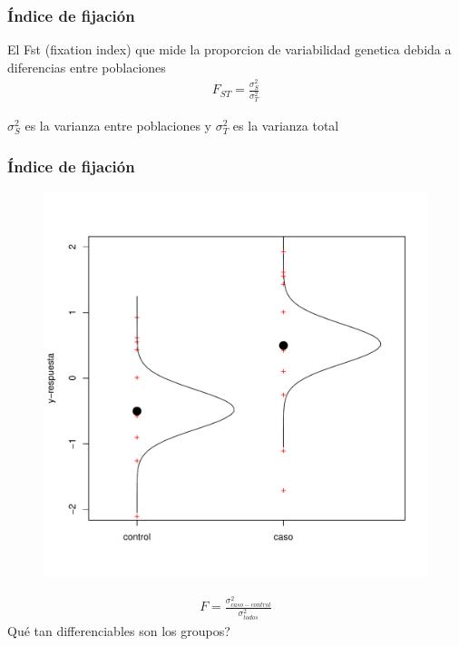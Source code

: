 \documentclass{beamer}\usepackage[]{graphicx}\usepackage[]{color}
\begin{document}
\begin{frame}[fragile]
\frametitle{\'Indice de fijaci\'on}

El Fst (fixation index) que mide la proporcion de variabilidad genetica debida a diferencias entre poblaciones 
\begin{eqnarray}
F_{ST}=\frac{\sigma^2_S}{\sigma^2_T}
\end{eqnarray}

$\sigma^2_S$ es la varianza entre poblaciones y $\sigma^2_T$ es la varianza total
\end{frame}

\begin{frame}[fragile]
\frametitle{\'Indice de fijaci\'on}

\begin{figure}[htbp]
\begin{center}
\includegraphics[width=.5\linewidth]{twogroup.pdf}
\end{center}
\end{figure}

\begin{eqnarray}
F=\frac{\sigma^2_{caso-control}}{\sigma^2_{todos}}
\end{eqnarray}
Qu\'e tan differenciables son los groupos?

\end{frame}
\end{document}
